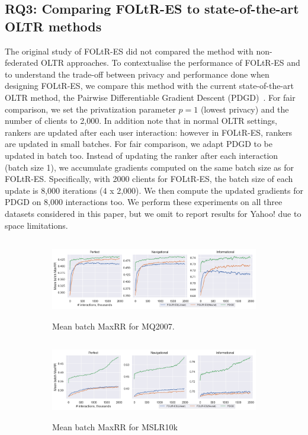 \subsection{RQ3: Comparing FOLtR-ES to state-of-the-art OLTR methods}
The original study of FOLtR-ES did not compared the method with non-federated OLTR approaches. To contextualise the performance of FOLtR-ES and to understand the trade-off between privacy and performance done when designing FOLtR-ES, we compare this method with the current state-of-the-art OLTR method, the Pairwise Differentiable Gradient Descent (PDGD)~\cite{oosterhuis2018differentiable}. For fair comparison, we set the privatization parameter $p=1$ (lowest privacy) and the number of clients to 2,000. In addition note that in normal OLTR settings, rankers are updated after each user interaction: however in FOLtR-ES, rankers are updated in small batches. For fair comparison, we adapt PDGD to be updated in batch too. Instead of updating the ranker after each interaction (batch size 1), we accumulate gradients computed on the same batch size as for FOLtR-ES. Specifically, with 2000 clients for FOLtR-ES, the batch size of each update is 8,000 iterations (4 x 2,000). We then compute the updated gradients for PDGD on 8,000 interactions too. %
We perform these experiments on all three datasets considered in this paper, but we omit to report results for Yahoo! due to space limitations. 

\begin{figure}[t]
	\centering
	\begin{subfigure}{1\textwidth}
		\includegraphics[width=13cm, height=3.5cm]{images/RQ3/mq2007_foltr_PDGD_mrr_c2000_p1.0.png}
		\caption{Mean batch MaxRR for MQ2007.}
		\label{fig:mq2007-rq3}
	\end{subfigure}
	\begin{subfigure}{1\textwidth}
		\includegraphics[width=13cm, height=3.5cm]{images/RQ3/mslr10k_foltr_PDGD_mrr_c2000_p1.0.png}
		\caption{Mean batch MaxRR for MSLR10k}
		\label{fig:mslr10k-rq3}
	\end{subfigure}
	\caption{{\color{red}{Results for RQ3: performance of FOLtR-ES and PDGD across datasets with privatization parameter $p=1$ and 2,000 clients (averaged across all dataset splits).}} \label{fig:RQ3}} 
\end{figure}

